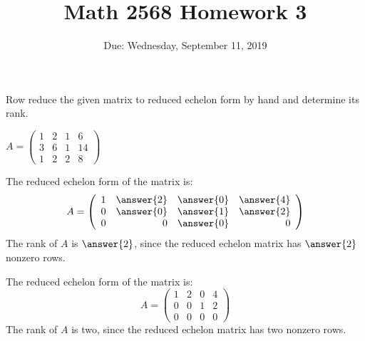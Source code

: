 \documentclass{article}
\title{Math 2568 Homework 3}
\author{\phantom{Dr. Golubitsky}}
\date{Due: Wednesday, September 11, 2019}
\begin{document}
\maketitle


\problemlabel

\noindent Row reduce the given  matrix to reduced echelon form by hand and determine its rank.

\begin{exercise} \label{c2.4.1}
$A=\left(\begin{array}{rrrr}
1 &  2 & 1 & 6\\
3 &  6 & 1 & 14\\
1 &  2 & 2 & 8
         \end{array}\right)$
       \begin{prompt}
       The reduced echelon form of the matrix is:
\[
A = \left(\begin{array}{rrrr} 1 & \answer{2} & \answer{0} & \answer{4} \\ 0 & \answer{0} & \answer{1} & \answer{2} \\ 0 & 0 & \answer{0}
& 0\end{array}\right)
\]
The rank of $A$ is $\answer{2}$, since the reduced echelon matrix has $\answer{2}$ nonzero
rows.         
       \end{prompt}

\begin{solution}

The reduced echelon form of the matrix is:
\[
A = \left(\begin{array}{rrrr} 1 & 2 & 0 & 4 \\ 0 & 0 & 1 & 2 \\ 0 & 0 & 0
& 0\end{array}\right)
\]
The rank of $A$ is two, since the reduced echelon matrix has two nonzero
rows.

\end{solution}
\end{exercise}

\problemlabel
\end{document}

